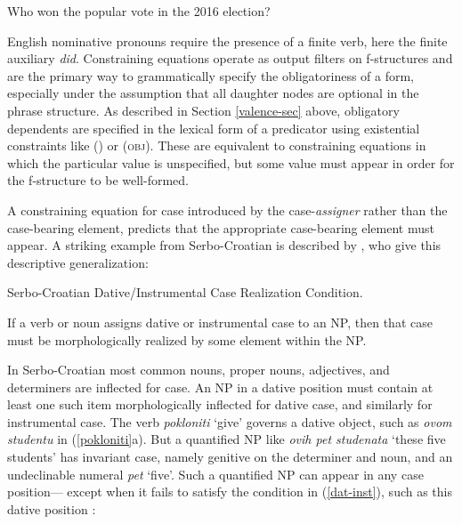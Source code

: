 \begin{exe}
\ex  Who won the popular vote in the 2016 election? 
\label{she}
\begin{xlist}
\end{xlist}
\end{exe}
English nominative pronouns require the presence of a finite verb, here the finite auxiliary \textit{did}.  Constraining equations operate as output filters on f-structures and are the primary way to grammatically specify the obligatoriness of a form, especially under the assumption that all daughter nodes are optional in the phrase structure.  As described in Section \ref{valence-sec} above, obligatory dependents are specified in the lexical form of a predicator using existential constraints like (\up \subj) or (\up \textsc{obj}).  These are equivalent to constraining equations in which the particular value is unspecified, but some value must appear in order for the f-structure to be well-formed.  

A constraining equation for case  introduced by the case-\textit{assigner} rather than the case-bearing element, predicts that the appropriate case-bearing element must appear.  A striking example from Serbo-Croatian is described by \citet[134]{WZ2003a}, who give this descriptive generalization:

\ea
{\label{dat-inst}
Serbo-Croatian Dative/Instrumental Case 
Realization Condition.\medskip

If a verb or noun assigns dative or instrumental case to an NP, then that case must be morphologically realized by some element within the NP.}
\z

\noindent
In Serbo-Croatian most common nouns, proper nouns, adjectives, and determiners are inflected for case.  An NP in a dative position must contain at least one such item morphologically inflected for dative case, and similarly for instrumental case.  The verb {\it pokloniti} `give' governs a dative object, such as \textit{ovom  studentu} in (\ref{pokloniti}a).  But a quantified NP like \textit{ovih pet studenata} `these five students' has invariant case, namely genitive on the determiner and noun, and an undeclinable numeral \textit{pet} `five'.  Such a quantified NP can appear in any case position--- except when it fails to satisfy the condition in (\ref{dat-inst}), such as this dative position \citep[125]{WZ2003a}:

\begin{exe} 
\ex	\label{pokloniti}
\begin{xlist}
\end{xlist}
\end{exe}

